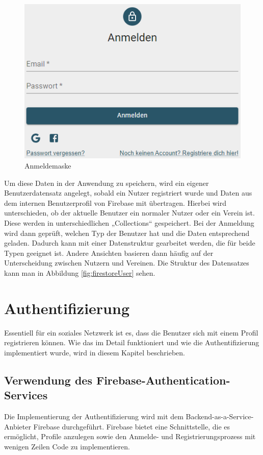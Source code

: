 \begin{figure}[ht!]
  \begin{centering}
    \includegraphics[width=.75\textwidth]{figures/implementation/anmeldemaske.png}
    \caption{Anmeldemaske}
    \label{fig:login}
  \end{centering}
\end{figure}

Um diese Daten in der Anwendung zu speichern, wird ein eigener Benutzerdatensatz angelegt, sobald ein Nutzer registriert wurde und Daten aus dem internen Benutzerprofil von Firebase mit übertragen.
Hierbei wird unterschieden, ob der aktuelle Benutzer ein normaler Nutzer oder ein Verein ist.
Diese werden in unterschiedlichen „Collections“ gespeichert.
Bei der Anmeldung wird dann geprüft, welchen Typ der Benutzer hat und die Daten entsprechend geladen.
Dadurch kann mit einer Datenstruktur gearbeitet werden, die für beide Typen geeignet ist.
Andere Ansichten basieren dann häufig auf der Unterscheidung zwischen Nutzern und Vereinen.
Die Struktur des Datensatzes kann man in Abbildung \ref{fig:firestoreUser} sehen.

\section{Authentifizierung}
\label{sec:authentifizierung}

Essentiell für ein soziales Netzwerk ist es, dass die Benutzer sich mit einem Profil registrieren können. Wie das im Detail funktioniert und wie die Authentifizierung implementiert wurde, wird in diesem Kapitel beschrieben.

\subsection{Verwendung des \glqq Firebase-Authentication\grqq-Services}
\label{sec:firebase_authentifizierung}
Die Implementierung der Authentifizierung wird mit dem Backend-as-a-Service-Anbieter Firebase durchgeführt. Firebase bietet eine Schnittstelle, die es ermöglicht, Profile anzulegen sowie den Anmelde- und Registrierungsprozess mit wenigen Zeilen Code zu implementieren.

